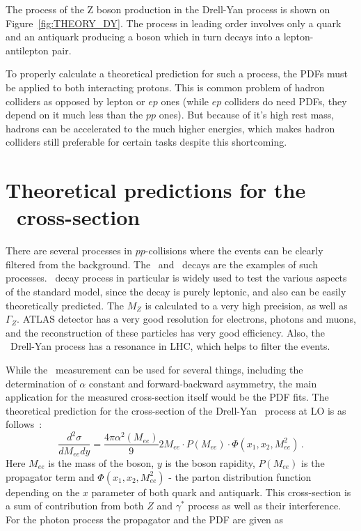 The process of the Z boson production in the Drell-Yan process is shown on Figure~\ref{fig:THEORY_DY}. The process in leading order involves only a quark and an antiquark producing a boson which in turn decays into a lepton-antilepton pair.

To properly calculate a theoretical prediction for such a process, the PDFs must be applied to both interacting protons. This is common problem of hadron colliders as opposed by lepton or $ep$ ones (while $ep$ colliders do need PDFs, they depend on it much less than the $pp$ ones). But because of it's high rest mass, hadrons can be accelerated to the much higher energies, which makes hadron colliders still preferable for certain tasks despite this shortcoming.

\section{Theoretical predictions for the \Zee\ cross-section}

There are several processes in $pp$-collisions where the events can be clearly filtered from the background. The \Wenu\ and \Zee\ decays are the examples of such processes. \Zll\ decay process in particular is widely used to test the various aspects of the standard model, since the decay is purely leptonic, and also can be easily theoretically predicted. The $M_Z$ is calculated to a very high precision, as well as $\Gamma_Z$. ATLAS detector has a very good resolution for electrons, photons and muons, and the reconstruction of these particles has very good efficiency. Also, the \Zee\ Drell-Yan process has a resonance in LHC, which helps to filter the events.

While the \Zll\ measurement can be used for several things, including the determination of $\alpha$ constant and forward-backward asymmetry, the main application for the measured cross-section itself would be the PDF fits. The theoretical prediction for the cross-section of the Drell-Yan \Zgee\ process at LO is as follows~\cite{lib:theory_Z-c-s}:
\begin{equation}
\label{eq:theory_c-s}
\frac{d^{2}\sigma}{dM_{ee}dy} = \frac{4\pi\alpha^{2}(M_{ee})}{9}2M_{ee}\cdot P(M_{ee})\cdot\Phi(x_{1},x_{2},M^{2}_{ee})\,.
\end{equation}
Here $M_{ee}$ is the mass of the boson, $y$ is the boson rapidity, $P(M_{ee})$ is the propagator term and $\Phi(x_{1},x_{2},M^{2}_{ee})$ - the parton distribution function depending on the $x$ parameter of both quark and antiquark. This cross-section is a sum of contribution from both $Z$ and $\gamma^*$ process as well as their interference. For the photon process the propagator and the PDF are given as

